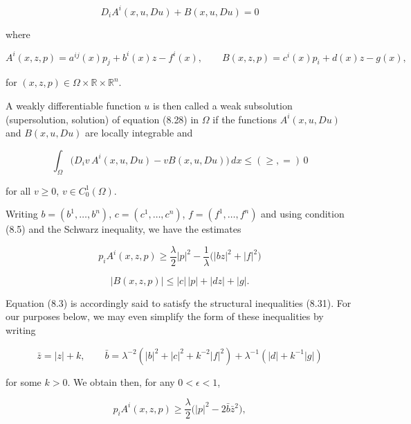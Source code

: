 \begin{equation}
    D_i A^i(x,u,Du)+B(x,u,Du)=0
    \tag{8.28}
\end{equation}

where

\begin{equation}
    A^i(x,z,p)=a^{ij}(x)p_j+b^i(x)z-f^i(x),
    \qquad
    B(x,z,p)=c^i(x)p_i+d(x)z-g(x),
    \tag{8.29}
\end{equation}

for $(x,z,p)\in \Omega\times \mathbb{R}\times \mathbb{R}^n$.

A weakly differentiable function $u$ is then called a weak subsolution (supersolution, solution) of equation (8.28) in $\Omega$ if the functions $A^i(x,u,Du)$ and $B(x,u,Du)$ are locally integrable and

\begin{equation}
    \int_\Omega \bigl(D_i v\,A^i(x,u,Du)-vB(x,u,Du)\bigr)\,dx \le (\ge,=)\,0
    \tag{8.30}
\end{equation}

for all $v \ge 0$, $v \in C_0^1(\Omega)$.

Writing $b=(b^1,\ldots,b^n)$, $c=(c^1,\ldots,c^n)$, $f=(f^1,\ldots,f^n)$ and using condition (8.5) and the Schwarz inequality, we have the estimates

\begin{equation}
    p_iA^i(x,z,p)\ge \frac{\lambda}{2}|p|^2-\frac{1}{\lambda}\bigl(|b z|^2+|f|^2\bigr)
    \tag{8.31}
\end{equation}

\begin{equation*}
    |B(x,z,p)|\le |c|\,|p|+|d z|+|g|.
\end{equation*}


Equation (8.3) is accordingly said to satisfy the structural inequalities (8.31). For our purposes below, we may even simplify the form of these inequalities by writing

\begin{equation}\tag{8.32}
\bar z = |z| + k,\qquad
\bar b = \lambda^{-2} (|b|^2 + |c|^2 + k^{-2}|f|^2) + \lambda^{-1} (|d| + k^{-1}|g|)
\end{equation}

for some $k>0$. We obtain then, for any $0 < \epsilon < 1$,

\begin{equation}\tag{8.33}
p_i A^i(x,z,p) \ge \frac{\lambda}{2} \bigl(|p|^2 - 2\bar b \bar z^2\bigr),
\end{equation}

